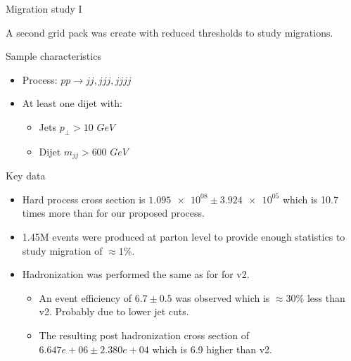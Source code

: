 \documentclass[8pt]{beamer}
\begin{document}
\begin{frame}{Migration study I}

A second grid pack was create with reduced thresholds to study migrations.

\begin{block}{Sample characteristics}

\begin{itemize}
  \item Process: $pp \rightarrow jj,jjj,jjjj$
  \item At least one dijet with:
  \begin{itemize}
    \item Jets $p_\perp > 10$ $GeV$
    \item Dijet $m_{jj} > 600$ $GeV$
  \end{itemize}
\end{itemize}

\end{block}

\begin{block}{Key data}

\begin{itemize}
  \item Hard process cross section is $\num{1.095e+08} \pm \num{3.924e+05}$ which is 10.7 times more than for our proposed process.
  \item 1.45M events were produced at parton level to provide enough statistics to study migration of $\approx 1\%$.
  \item Hadronization was performed the same as for for v2. 
  \begin{itemize}
    \item An event efficiency of $6.7 \pm 0.5$ was observed which is $\approx 30\%$ less than v2. Probably due to lower jet cuts.
    \item The resulting post hadronization cross section of $6.647e+06 \pm 2.380e+04$ which is 6.9 higher than v2.
  \end{itemize}
\end{itemize}

\end{block}

\end{frame}
\end{document}
